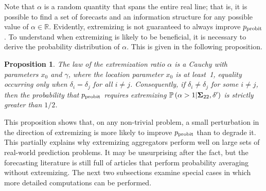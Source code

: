 \documentclass[12pt]{article}
\renewcommand{\P}{\mathbb{P}}
\newtheorem{proposition}[theorem]{Proposition}
\theoremstyle{definition}
\theoremstyle{definition}
\def\P{{\mathbb P}}
\def\probit{p_{\rm probit}}
\begin{document}
Note that $\alpha$ is a random quantity that spans the entire real line;
that is, it is possible to find a set of forecasts and an information structure for any possible value of $\alpha \in
\mathbb{R}$.  Evidently, extremizing is not guaranteed to always
improve $\probit$.  To understand when extremizing is
likely to be beneficial, it is necessary to derive the probability
distribution of $\alpha$. This is given in the following proposition.  

\begin{proposition}
\label{positiveProbThm}
The law of the extremization ratio $\alpha$ is a Cauchy with
parameters $x_0$ and $\gamma$, where the location parameter $x_0$ is
at least~1, equality occurring only when $\delta_i = \delta_j$ for all
$i \neq j$. Consequently, if $\delta_i \neq \delta_j$ for some
$i \neq j$, then the probability that $\probit$
requires extremizing $\P\left(\alpha > 1 | {\bf\Sigma}_{22}, \delta'\right)$
is strictly greater than $1/2$.
\end{proposition}
\noindent
This proposition shows that, on any non-trivial problem, a small
perturbation in the direction of extremizing is more likely to improve
$\probit$ than to degrade it.  This partially explains
why extremizing aggregators perform well on large sets of real-world
prediction problems.  It may be unsurprising after the fact, but the
forecasting literature is still full of articles that perform
probability averaging without extremizing. The next two subsections examine special cases in which more detailed computations can be performed.

\end{document}
